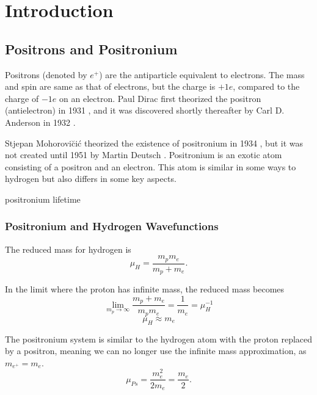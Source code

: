 \documentclass[Introduction.tex]{subfiles}
\begin{document}
\chapter{Introduction}
\label{sec:Introduction}


\section{Positrons and Positronium}
Positrons (denoted by $e^+$) are the antiparticle equivalent to electrons.  The mass and spin are same as that of electrons, but the charge is $+1e$, compared to the charge of $-1e$ on an electron. Paul Dirac first theorized the positron (antielectron) in 1931 \cite{Dirac1931}, and it was discovered shortly thereafter by Carl D. Anderson in 1932 \cite{Anderson1933}.

Stjepan Mohorovi\u{c}i\'{c} theorized the existence of positronium in 1934 \cite{Mohorovicic1934}, but it was not created until 1951 by Martin Deutsch \cite{Deutsch1951}. Positronium is an exotic atom consisting of a positron and an electron.  This atom is similar in some ways to hydrogen but also differs in some key aspects.

\cite{Wheeler1946}

positronium lifetime

\subsection{Positronium and Hydrogen Wavefunctions}
The reduced mass for hydrogen is
\begin{equation}
\mu_H = \frac{m_p m_e}{m_p + m_e}.
\end{equation}

In the limit where the proton has infinite mass, the reduced mass becomes
\begin{equation}
\lim_{m_p \to \infty} \frac{m_p + m_e}{m_p m_e} = \frac{1}{m_e} = \mu_H^{-1}
\end{equation}
\begin{equation}
\mu_H \approx m_e
\end{equation}

The positronium system is similar to the hydrogen atom with the proton replaced by a positron, meaning we can no longer use the infinite mass approximation, as $m_{e^+} = m_e$.
\begin{equation}
\mu_{Ps} = \frac{m_e^2}{2 m_e} = \frac{m_e}{2}.
\end{equation}
\end{document}
